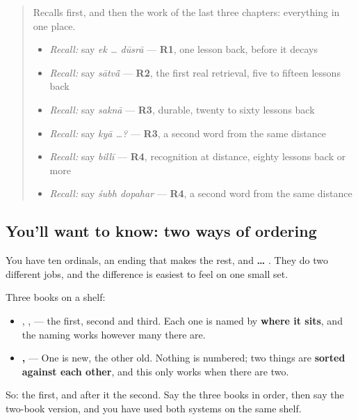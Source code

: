 \label{lesson:HI-C77-practice}



\begin{quote}
Recalls first, and then the work of the last three chapters: everything in one place.

\begin{itemize}
\raggedright
  \item \emph{Recall:} say \emph{ek … dūsrā} — \textbf{R1}, one lesson back, before it decays
  \item \emph{Recall:} say \emph{sātvā̃} — \textbf{R2}, the first real retrieval, five to fifteen lessons back
  \item \emph{Recall:} say \emph{saknā} — \textbf{R3}, durable, twenty to sixty lessons back
  \item \emph{Recall:} say \emph{kyā …?} — \textbf{R3}, a second word from the same distance
  \item \emph{Recall:} say \emph{billī} — \textbf{R4}, recognition at distance, eighty lessons back or more
  \item \emph{Recall:} say \emph{śubh dopahar} — \textbf{R4}, a second word from the same distance
\end{itemize}
\end{quote}

\subsection*{You'll want to know: two ways of ordering}
You have ten ordinals, an ending that makes the rest, and \textbf{ … }. They do two different jobs, and the difference is easiest to feel on one small set.

Three books on a shelf:

\begin{itemize}
\raggedright
  \item \textbf{ }, \textbf{ }, \textbf{ } — the first, second and third. Each one is named by \textbf{where it sits}, and the naming works however many there are.
  \item \textbf{   ,  } — One is new, the other old. Nothing is numbered; two things are \textbf{sorted against each other}, and this only works when there are two.
\end{itemize}

So: \textbf{} the first, and after it the second. Say the three books in order, then say the two-book version, and you have used both systems on the same shelf.

